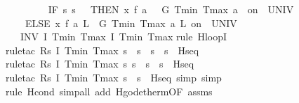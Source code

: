 \documentclass[envcountsame,envcountsect]{llncs}
\begin{document}
\begin{example}
\begin{isabellebody}
\ \ \ \ %
\isanewline
\ \ \ \ {\isacharparenleft}IF\ {\isacharparenleft}{\isasymlambda}s{\isachardot}\ s{\isachardollar}{}\ {\isacharequal}\ {}{\isacharparenright}\ THEN\ {\isacharparenleft}x{\isasymacute}{\isacharequal}\ f\ a\ {}\ {\isacharampersand}\ G\ Tmin\ Tmax\ a\ {}\ on\ {\isacharbraceleft}{}{\isachardot}{\isachardot}{\isasymtau}{\isacharbraceright}\ UNIV\ {\isacharat}\ {}{\isacharparenright}\ \isanewline
\ \ \ \ ELSE\ {\isacharparenleft}x{\isasymacute}{\isacharequal}\ f\ a\ L\ {\isacharampersand}\ G\ Tmin\ Tmax\ a\ L\ on\ {\isacharbraceleft}{}{\isachardot}{\isachardot}{\isasymtau}{\isacharbraceright}\ UNIV\ {\isacharat}\ {}{\isacharparenright}{\isacharparenright}\isanewline
\ \ {\isacharparenright}\ INV\ I\ Tmin\ Tmax{\isacharparenright}\ {\isasymlceil}I\ Tmin\ Tmax{\isasymrceil}{\isachardoublequoteclose}\isanewline
{}\isamarkupfalse%
{\isacharparenleft}rule\ H{\isacharunderscore}loopI{\isacharparenright}\isanewline
\ \ \ \ \isamarkupfalse%
{\isacharparenleft}rule{\isacharunderscore}tac\ R{\isacharequal}{\isachardoublequoteopen}{\isasymlambda}s{\isachardot}\ I\ Tmin\ Tmax\ s\ {\isasymand}\ s{\isachardollar}{}{\isacharequal}{}\ {\isasymand}\ s{\isachardollar}{}\ {\isacharequal}\ s{\isachardollar}{}{\isachardoublequoteclose}\ \ H{\isacharunderscore}seq{\isacharparenright}\isanewline
\ \ \ \ \ \isamarkupfalse%
{\isacharparenleft}rule{\isacharunderscore}tac\ R{\isacharequal}{\isachardoublequoteopen}{\isasymlambda}s{\isachardot}\ I\ Tmin\ Tmax\ s{\isasymand}\ s{\isachardollar}{}{\isacharequal}{}\ {\isasymand}\ s{\isachardollar}{}\ {\isacharequal}\ s{\isachardollar}{}{\isachardoublequoteclose}\ \ H{\isacharunderscore}seq{\isacharparenright}\isanewline
\ \ \ \ \ \ \isamarkupfalse%
{\isacharparenleft}rule{\isacharunderscore}tac\ R{\isacharequal}{\isachardoublequoteopen}{\isasymlambda}s{\isachardot}\ I\ Tmin\ Tmax\ s\ {\isasymand}\ s{\isachardollar}{}{\isacharequal}{}{\isachardoublequoteclose}\ \ H{\isacharunderscore}seq{\isacharcomma}\ simp{\isacharcomma}\ simp{\isacharparenright}\isanewline
\ \ \ \ \ \ \isamarkupfalse%
{\isacharparenleft}rule\ H{\isacharunderscore}cond{\isacharcomma}\ simp{\isacharunderscore}all\ add{\isacharcolon}\ H{\isacharunderscore}g{\isacharunderscore}ode{\isacharunderscore}therm{\isacharbrackleft}OF\ assms{\isacharparenleft}{}{\isacharcomma}{}{\isacharparenright}{\isacharbrackright}{\isacharparenright}{\isacharplus}\isanewline

\end{isabellebody}
\end{example}
\end{document}
